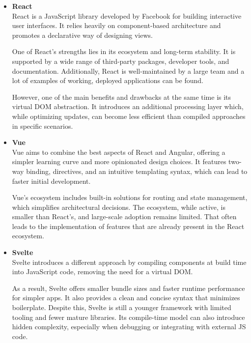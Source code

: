 \begin{itemize}
    \item \textbf{React} \\
    React is a JavaScript library developed by Facebook for building interactive user interfaces.
    It relies heavily on component-based architecture and promotes a declarative way of designing views.\cite{react}

    One of React’s strengths lies in its ecosystem and long-term stability.
    It is supported by a wide range of third-party packages, developer tools, and documentation.
    Additionally, React is well-maintained by a large team and a lot of examples of working, deployed applications can be found.

    However, one of the main benefits and drawbacks at the same time is its virtual DOM abstraction.
    It introduces an additional processing layer which, while optimizing updates,
    can become less efficient than compiled approaches in specific scenarios.

    \item \textbf{Vue} \\
    Vue aims to combine the best aspects of React and Angular,
    offering a simpler learning curve and more opinionated design choices.\cite{vue}
    It features two-way binding, directives, and an intuitive templating syntax,
    which can lead to faster initial development.

    Vue's ecosystem includes built-in solutions for routing and state management,
    which simplifies architectural decisions.
    The ecosystem, while active, is smaller than React’s, and large-scale adoption remains limited.\cite{webstats}
    That often leads to the implementation of features that are already present in the React ecosystem.
    \item \textbf{Svelte} \\
    Svelte introduces a different approach by compiling components at build time into JavaScript code,
    removing the need for a virtual DOM.\cite{svelte}

    As a result, Svelte offers smaller bundle sizes and faster runtime performance for simpler apps.
    It also provides a clean and concise syntax that minimizes boilerplate.
    Despite this, Svelte is still a younger framework with limited tooling and fewer mature libraries.
    Its compile-time model can also introduce hidden complexity, especially when debugging or integrating with external
    JS code.
\end{itemize}

